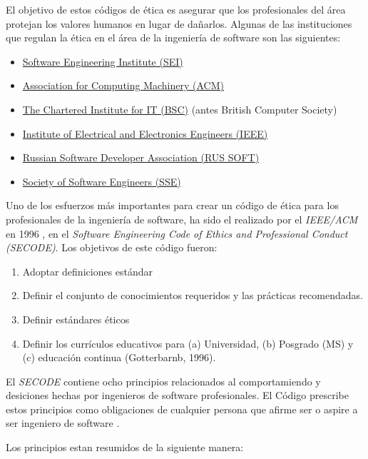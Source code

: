 \documentclass[twoside]{article}
\begin{document}
\begin{multicols}{2}
El objetivo de estos códigos de ética es asegurar que los profesionales del área
protejan los valores humanos en lugar de dañarlos. Algunas de las instituciones
que regulan la ética en el área de la ingeniería de software son las siguientes:

\begin{itemize}
    \item \href{https://www.sei.cmu.edu/}{Software Engineering Institute (SEI)}
    \item \href{https://www.acm.org/}{Association for Computing Machinery (ACM)}
\item \href{https://www.bcs.org/}{The Chartered Institute for IT (BSC)} (antes
British Computer Society)
\item \href{https://www.ieee.org/}{Institute of Electrical and Electronics
Engineers (IEEE)} \cite{rogerson2002software}
    \item \href{https://russoft.org/}{Russian Software Developer Association (RUS SOFT)}
    \item \href{https://sse.rit.edu/}{Society of Software Engineers (SSE)}
\end{itemize}

Uno de los esfuerzos más importantes para crear un código de ética para los
profesionales de la ingeniería de software, ha sido el realizado por el
\textit{IEEE/ACM} en 1996 \cite{gotterbarn2001software}, en el \textit{Software
Engineering Code of Ethics and Professional Conduct (SECODE)}. Los objetivos de este
código fueron:

\begin{enumerate}
    \item Adoptar definiciones estándar
    \item Definir el conjunto de conocimientos requeridos y las prácticas recomendadas.
    \item Definir estándares éticos
    \item Definir los currículos educativos para (a) Universidad, (b) Posgrado (MS) y (c)
educación continua (Gotterbarnb, 1996).
\end{enumerate}

El \textit{SECODE} contiene ocho principios relacionados al comportamiendo y
desiciones hechas por ingenieros de software profesionales. El Código prescribe
estos principios como obligaciones de cualquier persona que afirme ser o aspire
a ser ingeniero de software \cite{vallor2015introduction}.

Los principios estan resumidos de la siguiente manera:


\end{multicols}
\end{document}
